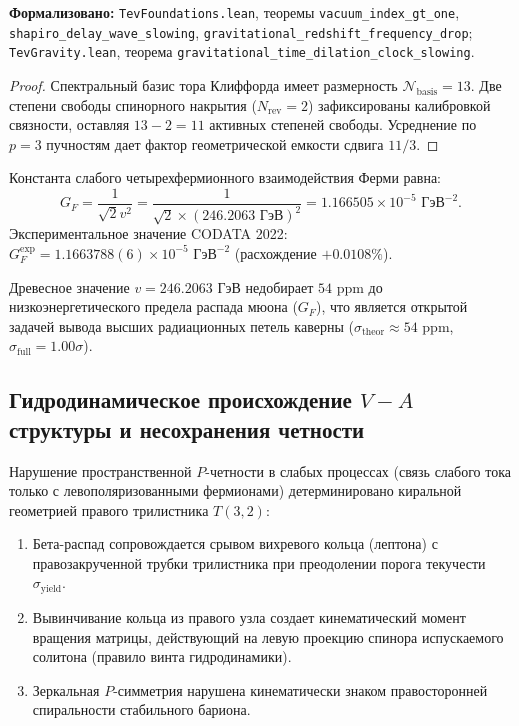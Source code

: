 \documentclass[11pt,a4paper]{article}
\theoremstyle{definition}
\theoremstyle{remark}
\begin{document}
\noindent\small\textbf{Формализовано:} \texttt{TevFoundations.lean}, теоремы \texttt{vacuum_index_gt_one}, \texttt{shapiro_delay_wave_slowing}, \texttt{gravitational_redshift_frequency_drop}; \texttt{TevGravity.lean}, теорема \texttt{gravitational_time_dilation_clock_slowing}.

\begin{proof}
Спектральный базис тора Клиффорда имеет размерность $\mathcal{N}_{\mathrm{basis}} = 13$. Две степени свободы спинорного накрытия ($N_{\mathrm{rev}} = 2$) зафиксированы калибровкой связности, оставляя $13 - 2 = 11$ активных степеней свободы. Усреднение по $p=3$ пучностям дает фактор геометрической емкости сдвига $11/3$.
\end{proof}
	
Константа слабого четырехфермионного взаимодействия Ферми равна:
\begin{equation}
	G_F = \frac{1}{\sqrt{2} v^2} = \frac{1}{\sqrt{2} \times (246.2063\text{ ГэВ})^2} = 1.166505 \times 10^{-5}\text{ ГэВ}^{-2}.
\label{eq:fermi_constant_exact}
\end{equation}
Экспериментальное значение CODATA 2022: $G_F^{\mathrm{exp}} = 1.1663788(6) \times 10^{-5}\text{ ГэВ}^{-2}$ (расхождение $+0.0108\%$).

Древесное значение $v = 246.2063\text{ ГэВ}$ недобирает $54\text{ ppm}$ до низкоэнергетического предела распада мюона ($G_F$), что является открытой задачей вывода высших радиационных петель каверны ($\sigma_{\mathrm{theor}} \approx 54\text{ ppm}$, $\sigma_{\mathrm{full}} = 1.00\sigma$).

\subsection{Гидродинамическое происхождение $V-A$ структуры и несохранения четности}

Нарушение пространственной $P$-четности в слабых процессах (связь слабого тока только с левополяризованными фермионами) детерминировано киральной геометрией правого трилистника $T(3,2)$:
\begin{enumerate}
\item Бета-распад сопровождается срывом вихревого кольца (лептона) с правозакрученной трубки трилистника при преодолении порога текучести $\sigma_{\mathrm{yield}}$.
\item Вывинчивание кольца из правого узла создает кинематический момент вращения матрицы, действующий на левую проекцию спинора испускаемого солитона (правило винта гидродинамики).
\item Зеркальная $P$-симметрия нарушена кинематически знаком правосторонней спиральности стабильного бариона.
\end{enumerate}
\end{document}
